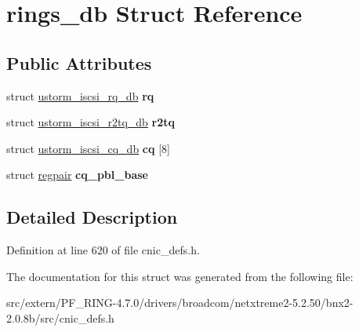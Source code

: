 \hypertarget{structrings__db}{
\section{rings\_\-db Struct Reference}
\label{structrings__db}
}
\subsection*{Public Attributes}
\begin{DoxyCompactItemize}
\item 
\hypertarget{structrings__db_a82f0275b40f9ba0709cfaf1ec6d50dbd}{
struct \hyperlink{structustorm__iscsi__rq__db}{ustorm\_\-iscsi\_\-rq\_\-db} {\bfseries rq}}
\label{structrings__db_a82f0275b40f9ba0709cfaf1ec6d50dbd}

\item 
\hypertarget{structrings__db_abef8bfa4596336347223232f9881d1d0}{
struct \hyperlink{structustorm__iscsi__r2tq__db}{ustorm\_\-iscsi\_\-r2tq\_\-db} {\bfseries r2tq}}
\label{structrings__db_abef8bfa4596336347223232f9881d1d0}

\item 
\hypertarget{structrings__db_a5fc161868a5863896068d8bc97345dcb}{
struct \hyperlink{structustorm__iscsi__cq__db}{ustorm\_\-iscsi\_\-cq\_\-db} {\bfseries cq} \mbox{[}8\mbox{]}}
\label{structrings__db_a5fc161868a5863896068d8bc97345dcb}

\item 
\hypertarget{structrings__db_a727e47961e667f570022c4eee0b182ef}{
struct \hyperlink{structregpair}{regpair} {\bfseries cq\_\-pbl\_\-base}}
\label{structrings__db_a727e47961e667f570022c4eee0b182ef}

\end{DoxyCompactItemize}


\subsection{Detailed Description}


Definition at line 620 of file cnic\_\-defs.h.



The documentation for this struct was generated from the following file:\begin{DoxyCompactItemize}
\item 
src/extern/PF\_\-RING-\/4.7.0/drivers/broadcom/netxtreme2-\/5.2.50/bnx2-\/2.0.8b/src/cnic\_\-defs.h\end{DoxyCompactItemize}
